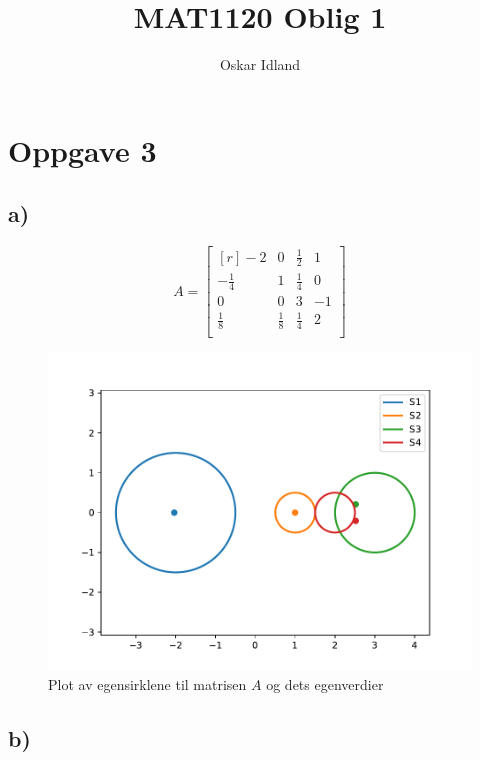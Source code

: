 \documentclass{article}
\author{Oskar Idland}
\title{MAT1120 Oblig 1}
\date{}
\begin{document}
\maketitle
\newpage

\section*{Oppgave 3}
  \subsection*{a)}

  \[ 
  A =
  \begin{bmatrix*}[r]
   -2 & 0 & \frac{1}{2} & 1 \\[1.25ex]
   - \frac{1}{4} & 1 & \frac{1}{4} & 0 \\[1.25ex]
   0 & 0 & 3 & -1 \\[1.25ex]
   \frac{1}{8} & \frac{1}{8} & \frac{1}{4} & 2 \\
  \end{bmatrix*}
  \]
    \begin{figure}[h!]
      \centering
      \includegraphics[scale = .4]{Oppgave_3A_plot.pdf}
      \caption{Plot av egensirklene til matrisen $ A $ og dets egenverdier}
      \label{fig:Matrix A}
    \end{figure}



    \subsection*{b)}
\end{document}
